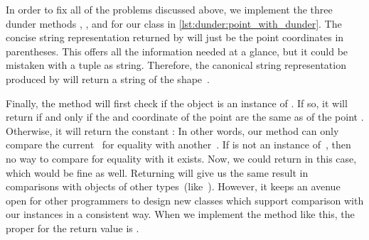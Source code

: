 In order to fix all of the problems discussed above, we implement the three dunder methods , , and  for our  class in \cref{lst:dunder:point_with_dunder}.
The concise string representation returned by  will just be the point coordinates in parentheses.
This offers all the information needed at a glance, but it could be mistaken with a tuple as string.
Therefore, the canonical string representation produced by  will return a string of the shape~.

Finally, the  method will first check if the  object is an instance of .
If so, it will return  if and only if the  and  coordinate of the  point are the same as of the point .
Otherwise, it will return the constant :%
%
%
%
In other words, our  method can only compare the current~ for equality with another~.
If  is not an instance of~, then no way to compare for equality with it exists.
Now, we could return  in this case, which would be fine as well.
Returning  will give us the same result in comparisons with objects of other types~(like~).
However, it keeps an avenue open for other programmers to design new classes which support comparison with our  instances in a consistent way.
When we implement the  method like this, the proper  for the return value is .

